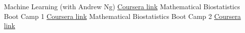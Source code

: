 \begin{cvskills}
	\cvskill
		{Machine Learning (with Andrew Ng)}
		{\href{https://www.coursera.org/learn/machine-learning}{Coursera link}}
	\cvskill
		{Mathematical Biostatistics Boot Camp 1}
		{\href{https://www.coursera.org/learn/biostatistics}{Coursera link}}
	\cvskill
		{Mathematical Biostatistics Boot Camp 2}
		{\href{https://www.coursera.org/learn/biostatistics-2}{Coursera link}}
\end{cvskills}
